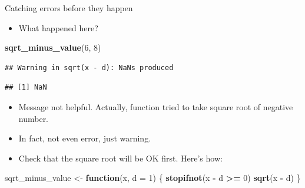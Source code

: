 \documentclass[ignorenonframetext,]{beamer}
\newenvironment{Shaded}{\begin{snugshade}}{\end{snugshade}}
\newcommand{\ControlFlowTok}[1]{\textcolor[rgb]{0.13,0.29,0.53}{\textbf{#1}}}
\newcommand{\DataTypeTok}[1]{\textcolor[rgb]{0.13,0.29,0.53}{#1}}
\newcommand{\DecValTok}[1]{\textcolor[rgb]{0.00,0.00,0.81}{#1}}
\newcommand{\KeywordTok}[1]{\textcolor[rgb]{0.13,0.29,0.53}{\textbf{#1}}}
\newcommand{\NormalTok}[1]{#1}
\newcommand{\OperatorTok}[1]{\textcolor[rgb]{0.81,0.36,0.00}{\textbf{#1}}}
\newcommand{\StringTok}[1]{\textcolor[rgb]{0.31,0.60,0.02}{#1}}
\providecommand{\tightlist}{%
  \setlength{\itemsep}{0pt}\setlength{\parskip}{0pt}}
\begin{document}
\begin{frame}[fragile]{Catching errors before they happen}
\protect\hypertarget{catching-errors-before-they-happen}{}

\begin{itemize}
\tightlist
\item
  What happened here?
\end{itemize}

\begin{Shaded}
\begin{Highlighting}[]
\KeywordTok{sqrt_minus_value}\NormalTok{(}\DecValTok{6}\NormalTok{, }\DecValTok{8}\NormalTok{)}
\end{Highlighting}
\end{Shaded}

\begin{verbatim}
## Warning in sqrt(x - d): NaNs produced
\end{verbatim}

\begin{verbatim}
## [1] NaN
\end{verbatim}

\begin{itemize}
\tightlist
\item
  Message not helpful. Actually, function tried to take square root of
  negative number.
\item
  In fact, not even error, just warning.
\item
  Check that the square root will be OK first. Here's how:
\end{itemize}

\begin{Shaded}
\begin{Highlighting}[]
\NormalTok{sqrt_minus_value <-}\StringTok{ }\ControlFlowTok{function}\NormalTok{(x, }\DataTypeTok{d =} \DecValTok{1}\NormalTok{) \{}
  \KeywordTok{stopifnot}\NormalTok{(x }\OperatorTok{-}\StringTok{ }\NormalTok{d }\OperatorTok{>=}\StringTok{ }\DecValTok{0}\NormalTok{)}
  \KeywordTok{sqrt}\NormalTok{(x }\OperatorTok{-}\StringTok{ }\NormalTok{d)}
\NormalTok{\}}
\end{Highlighting}
\end{Shaded}

\end{frame}
\end{document}
